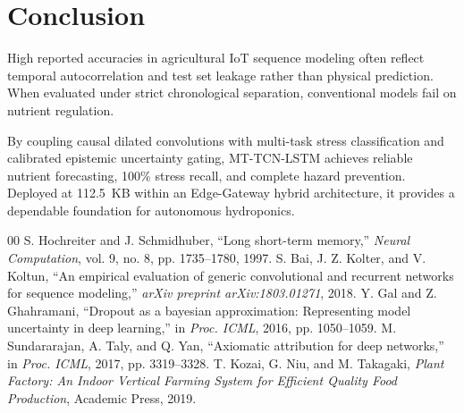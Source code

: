\documentclass[conference]{IEEEtran}
\begin{document}
\section{Conclusion}
High reported accuracies in agricultural IoT sequence modeling often reflect temporal autocorrelation and test set leakage rather than physical prediction. When evaluated under strict chronological separation, conventional models fail on nutrient regulation.

By coupling causal dilated convolutions with multi-task stress classification and calibrated epistemic uncertainty gating, MT-TCN-LSTM achieves reliable nutrient forecasting, 100\% stress recall, and complete hazard prevention. Deployed at 112.5~KB within an Edge-Gateway hybrid architecture, it provides a dependable foundation for autonomous hydroponics.

\balance

\begin{thebibliography}{00}
 S. Hochreiter and J. Schmidhuber, ``Long short-term memory,'' \textit{Neural Computation}, vol. 9, no. 8, pp. 1735--1780, 1997.
 S. Bai, J. Z. Kolter, and V. Koltun, ``An empirical evaluation of generic convolutional and recurrent networks for sequence modeling,'' \textit{arXiv preprint arXiv:1803.01271}, 2018.
 Y. Gal and Z. Ghahramani, ``Dropout as a bayesian approximation: Representing model uncertainty in deep learning,'' in \textit{Proc. ICML}, 2016, pp. 1050--1059.
 M. Sundararajan, A. Taly, and Q. Yan, ``Axiomatic attribution for deep networks,'' in \textit{Proc. ICML}, 2017, pp. 3319--3328.
 T. Kozai, G. Niu, and M. Takagaki, \textit{Plant Factory: An Indoor Vertical Farming System for Efficient Quality Food Production}, Academic Press, 2019.
\end{thebibliography}
\end{document}
